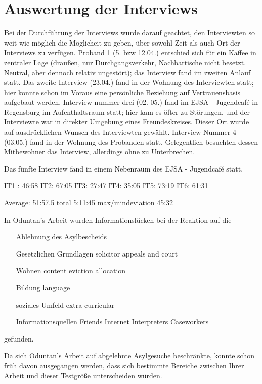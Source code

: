 \section{Auswertung der Interviews}

Bei der Durchführung der Interviews wurde darauf geachtet, den Interviewten so weit wie möglich die Möglicheit zu geben, über sowohl Zeit als auch Ort der Interviews zu verfügen. Proband 1 (5. bzw 12.04.) entschied sich für ein Kaffee in zentraler Lage (draußen, nur Durchgangsverkehr, Nachbartische nicht besetzt. Neutral, aber dennoch relativ ungestört); das Interview fand im zweiten Anlauf statt.\newline
Das zweite Interview (23.04.) fand in der Wohnung des Interviewten statt; hier konnte schon im Voraus eine persönliche Beziehung auf Vertrauensbasis aufgebaut werden.
Interview nummer drei (02. 05.) fand im EJSA - Jugendcafé in Regensburg im Aufenthaltsraum statt; hier kam es öfter zu Störungen, und der Interviewte war in direkter Umgebung eines Freundeskreises. Dieser Ort wurde auf ausdrücklichen Wunsch des Interviewten gewählt.
Interview Nummer 4 (03.05.) fand in der Wohnung des Probanden statt. Gelegentlich besuchten dessen Mitbewohner das Interview, allerdings ohne zu Unterbrechen. 

 Das fünfte Interview fand in einem Nebenraum des EJSA - Jugendcafé statt.

IT1 :	46:58
IT2: 	67:05
IT3:	27:47
IT4:	35:05
IT5:	73:19
IT6: 	61:31

Average:			51:57.5
total				5:11:45
max/mindeviation	45:32

In Oduntan's Arbeit wurden Informationslücken bei der Reaktion auf die 
\begin{enumerate}
	\item[Ablehnung des Asylbescheids]
	\item[Gesetzlichen Grundlagen]
		solicitor
		appeals and court
	\item [Wohnen]
		content
		eviction
		allocation
	\item [Bildung]
		language
	\item [soziales Umfeld]
		extra-curricular
	\item [Informationsquellen]
		Friends
		Internet
		Interpreters
		Caseworkers	
\end{enumerate} 

gefunden.\newline

Da sich Oduntan's Arbeit auf abgelehnte Asylgesuche beschränkte, konnte schon früh davon ausgegangen werden, dass sich bestimmte Bereiche zwischen Ihrer Arbeit und dieser Testgröße unterscheiden würden.

